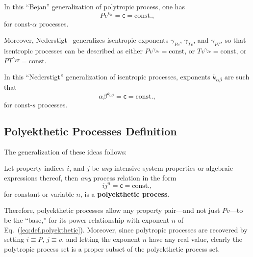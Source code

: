     In this ``Bejan'' generalization of polytropic process, one has
    \begin{equation}
        Pv^{k_{\alpha}} = \mathsf{c} = \mbox{const.},
        \label{eq:gen.Bejan}
    \end{equation}
    \noindent for const-$\alpha$ processes.

    Moreover,  Nederstigt~\cite{2017-NederstigtP-TUDelft}   generalizes   isentropic   exponents
    $\gamma_{Pv}$, $\gamma_{Tv}$,  and  $\gamma_{PT}$,  so  that  isentropic  processes  can  be
    described as either $Pv^{\gamma_{Pv}} = \mbox{const}$, or $Tv^{\gamma_{Tv}} = \mbox{const}$,
    or $PT^{\gamma_{PT}} = \mbox{const}$.

    In this ``Nederstigt'' generalization of isentropic processes,  exponents  $k_{\alpha\beta}$
    are such that
    \begin{equation}
        \alpha\beta^{k_{\alpha\beta}} = \mathsf{c} = \mbox{const.},
        \label{eq:gen.Nederstigt}
    \end{equation}
    \noindent for const-$s$ processes.

    \subsection{Polyekthetic Processes Definition}

    The generalization of these ideas follows:

    \begin{definition}\label{def:polyekthetic}
        Let property  indices  $i$,  and  $j$  be  \emph{any}  intensive  system  properties  or
        algebraic expressions thereof, then \emph{any} process relation in the form
        \begin{equation}
            ij^n = \mathsf{c} = \mbox{const.},
            \label{eq:def.polyekthetic}
        \end{equation}
        \noindent for constant or variable $n$, is a \textbf{polyekthetic process}.
    \end{definition}

    Therefore, polyekthetic processes allow any property pair---and not just  $Pv$---to  be  the
    ``base,'' for its power relationship with exponent $n$  of  Eq.~(\ref{eq:def.polyekthetic}).
    Moreover, since polytropic processes are recovered by setting $i \equiv P$,  $j  \equiv  v$,
    and letting the exponent $n$ have any real value, clearly the polytropic process  set  is  a
    proper subset of the polyekthetic process set.

